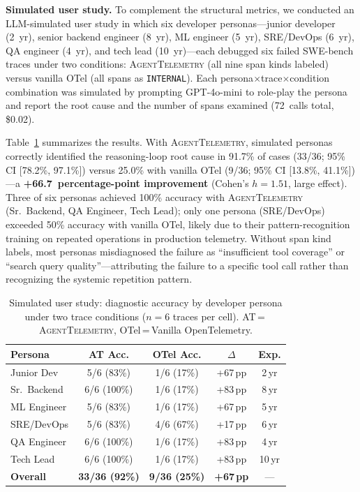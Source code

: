 \documentclass[sigplan,10pt,screen]{acmart}
\begin{document}
\textbf{Simulated user study.}
To complement the structural metrics, we conducted an LLM-simulated
user study in which six developer personas---junior developer (2~yr),
senior backend engineer (8~yr), ML engineer (5~yr), SRE/DevOps (6~yr),
QA engineer (4~yr), and tech lead (10~yr)---each debugged six failed
SWE-bench traces under two conditions: \textsc{AgentTelemetry} (all
nine span kinds labeled) versus vanilla OTel (all spans as
\texttt{INTERNAL}).  Each persona$\times$trace$\times$condition
combination was simulated by prompting GPT-4o-mini to role-play the
persona and report the root cause and the number of spans examined
(72~calls total, \$0.02).

Table~\ref{tab:user-study} summarizes the results.  With
\textsc{AgentTelemetry}, simulated personas correctly identified the
reasoning-loop root cause in 91.7\% of cases (33/36; 95\% CI
[78.2\%, 97.1\%]) versus 25.0\% with vanilla OTel (9/36; 95\% CI
[13.8\%, 41.1\%])---a \textbf{+66.7~percentage-point improvement}
(Cohen's $h=1.51$, large effect).  Three of six personas achieved
100\% accuracy with \textsc{AgentTelemetry} (Sr.\ Backend, QA
Engineer, Tech Lead); only one persona (SRE/DevOps) exceeded 50\%
accuracy with vanilla OTel, likely due to their pattern-recognition
training on repeated operations in production telemetry.
Without span kind labels, most personas misdiagnosed
the failure as ``insufficient tool coverage'' or ``search query
quality''---attributing the failure to a specific tool call rather than
recognizing the systemic repetition pattern.

\begin{table}[t]
\centering
\small
\caption{Simulated user study: diagnostic accuracy by developer
persona under two trace conditions ($n{=}6$ traces per cell).
AT\,=\,\textsc{AgentTelemetry}, OTel\,=\,Vanilla OpenTelemetry.}
\label{tab:user-study}
\begin{tabular}{@{}lcccc@{}}
\toprule
\textbf{Persona} & \textbf{AT Acc.} & \textbf{OTel Acc.} & \textbf{$\Delta$} & \textbf{Exp.} \\
\midrule
Junior Dev        & 5/6 (83\%)  & 1/6 (17\%) & +67\,pp & 2\,yr \\
Sr.\ Backend      & 6/6 (100\%) & 1/6 (17\%) & +83\,pp & 8\,yr \\
ML Engineer       & 5/6 (83\%)  & 1/6 (17\%) & +67\,pp & 5\,yr \\
SRE/DevOps        & 5/6 (83\%)  & 4/6 (67\%) & +17\,pp & 6\,yr \\
QA Engineer       & 6/6 (100\%) & 1/6 (17\%) & +83\,pp & 4\,yr \\
Tech Lead         & 6/6 (100\%) & 1/6 (17\%) & +83\,pp & 10\,yr \\
\midrule
\textbf{Overall}  & \textbf{33/36 (92\%)} & \textbf{9/36 (25\%)} & \textbf{+67\,pp} & --- \\
\bottomrule
\end{tabular}
\end{table}
\end{document}
